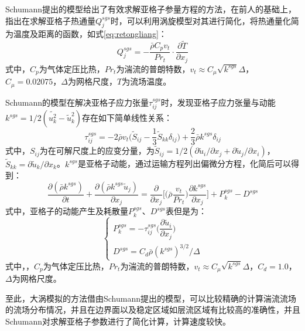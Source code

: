 Schumann提出的模型给出了有效求解亚格子参量方程的方法，在前人的基础上，指出在求解亚格子热通量$Q_j^{sgs}$时，可以利用涡旋模型对其进行简化，将热通量化简为温度及距离的函数，如式\eqref{eq:retongliang}：
\begin{equation}
Q^{sgs}_j=-\frac{\bar{\rho}C_pv_t}{Pr_t}\cdot\frac{\partial\tilde{T}}{\partial x_j}
\label{eq:retongliang}
\end{equation}
式中，$C_p$为气体定压比热，$Pr_t$为湍流的普朗特数，$v_t\approx C_\mu\sqrt{k^{sgs}}\Delta$，$C_\mu=0.02075$，$\Delta$为网格尺度，$T$为流场温度。

Schumann的模型在解决亚格子应力张量$\tau_{ij}^{sgs}$时，发现亚格子应力张量与动能$k^{sgs}=1/2(\widetilde{u^{2}_{k}}-\tilde{u}^2_k)$存在如下简单线性关系：
\begin{equation}
\tau^{sgs}_{ij}=-2\bar{\rho}v_t\big(\tilde{S}_{ij}-\frac{1}{3}\tilde{S}_{kk}\delta_{ij}\big)+\frac{2}{3}\bar{\rho}k^{sgs}\delta_{ij}
\end{equation}
式中，$S_{ij}$为在可解尺度上的应变分量，为$\tilde{S}_{ij}=1/2(\partial\tilde{u}_i/\partial x_j+\partial\tilde{u}_j/\partial x_i)$，$\tilde{S}_{kk}=\partial\tilde{u}_k/\partial x_k$。$k^{sgs}$是亚格子动能，通过运输方程列出偏微分方程\cite{Chakravarthy2001}，化简后可以得到：
\begin{equation}
\frac{\partial(\bar{\rho}k^{sgs})}{\partial t}+\frac{\partial(\bar{\rho}k^{sgs}\tilde{u}_j)}{\partial x_j}=\frac{\partial}{\partial x_j}\Big[\Big(\bar{\rho}\frac{v_t}{Pr_t}\Big)\frac{\partial k^{sgs}}{\partial x_j}\Big]+P_{k}^{sgs}-D^{sgs}
\end{equation}
式中，亚格子的动能产生及耗散量$P_k^{sgs}\text{、}D^{sgs}$表但是为：
\begin{equation}
\begin{cases}
P_k^{sgs}=-\tau_{ij}^{sgs}\big(\dfrac{\partial\tilde{u}_i}{\partial x_j}\big)\\
D^{sgs}=C_d\bar{\rho}(k^{sgs})^{3/2}/\Delta
\end{cases}
\end{equation}
式中，，$C_p$为气体定压比热，$Pr_t$为湍流的普朗特数，$v_t\approx C_\mu\sqrt{k^{sgs}}\Delta$，$C_d=1.0$，$\Delta$为网格尺度。

至此，大涡模拟的方法借由Schumann提出的模型，可以比较精确的计算湍流流场的流场分布情况，并且在边界面以及稳定区域如层流区域有比较高的准确性，并且Schumann对求解亚格子参数进行了简化计算，计算速度较快。


